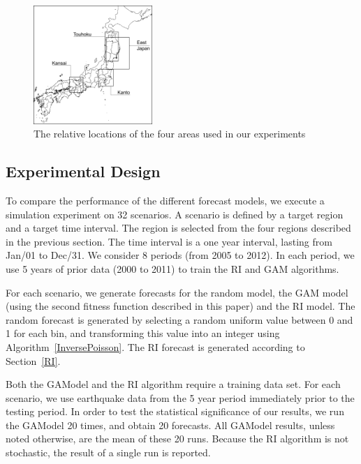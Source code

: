 \documentclass[a4paper,twoside]{article}
\begin{document}
\begin{figure}
  \begin{center}
  \includegraphics[width=0.40\textwidth]{img/alljapan.png}
  \end{center}
  \caption{The relative locations of the four areas used in our
    experiments}
  \label{areamap}
\end{figure}

\subsection{Experimental Design} %

To compare the performance of the different forecast models, we
execute a simulation experiment on 32 scenarios. A scenario is defined
by a target region and a target time interval. The region is selected
from the four regions described in the previous section. The time
interval is a one year interval, lasting from Jan/01 to Dec/31. We
consider 8 periods (from 2005 to 2012). In each period, we use 5 years
of prior data (2000 to 2011) to train the RI and GAM algorithms.

For each scenario, we generate forecasts for the random model, the GAM
model (using the second fitness function described in this paper) and
the RI model. The random forecast is generated by selecting a random
uniform value between 0 and 1 for each bin, and transforming this
value into an integer using Algorithm~\ref{InversePoisson}. The RI
forecast is generated according to Section~\ref{RI}.

Both the GAModel and the RI algorithm require a training data set. For
each scenario, we use earthquake data from the 5 year period
immediately prior to the testing period. In order to test the
statistical significance of our results, we run the GAModel 20 times,
and obtain 20 forecasts. All GAModel results, unless noted otherwise,
are the mean of these 20 runs. Because the RI algorithm is not
stochastic, the result of a single run is reported.
\end{document}
